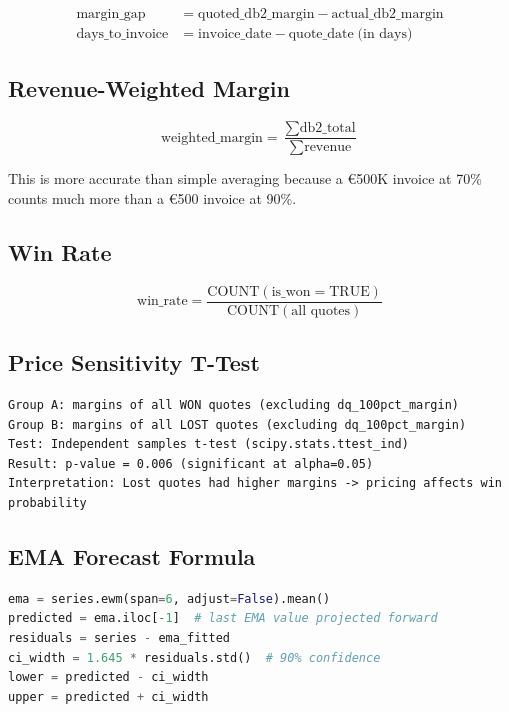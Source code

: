 \documentclass[11pt,a4paper]{article}
\newcommand{\EUR}{\euro{}}
\begin{document}
\begin{align}
\text{margin\_gap} &= \text{quoted\_db2\_margin} - \text{actual\_db2\_margin} \\
\text{days\_to\_invoice} &= \text{invoice\_date} - \text{quote\_date} \;\text{(in days)}
\end{align}

\subsection{Revenue-Weighted Margin}

\[
\text{weighted\_margin} = \frac{\sum \text{db2\_total}}{\sum \text{revenue}}
\]

This is more accurate than simple averaging because a \EUR500K invoice at 70\% counts much more than a \EUR500 invoice at 90\%.

\subsection{Win Rate}

\[
\text{win\_rate} = \frac{\text{COUNT}(\text{is\_won} = \text{TRUE})}{\text{COUNT}(\text{all quotes})}
\]

\subsection{Price Sensitivity T-Test}

\begin{lstlisting}
Group A: margins of all WON quotes (excluding dq_100pct_margin)
Group B: margins of all LOST quotes (excluding dq_100pct_margin)
Test: Independent samples t-test (scipy.stats.ttest_ind)
Result: p-value = 0.006 (significant at alpha=0.05)
Interpretation: Lost quotes had higher margins -> pricing affects win probability
\end{lstlisting}

\subsection{EMA Forecast Formula}

\begin{lstlisting}[language=Python]
ema = series.ewm(span=6, adjust=False).mean()
predicted = ema.iloc[-1]  # last EMA value projected forward
residuals = series - ema_fitted
ci_width = 1.645 * residuals.std()  # 90% confidence
lower = predicted - ci_width
upper = predicted + ci_width
\end{lstlisting}
\end{document}
